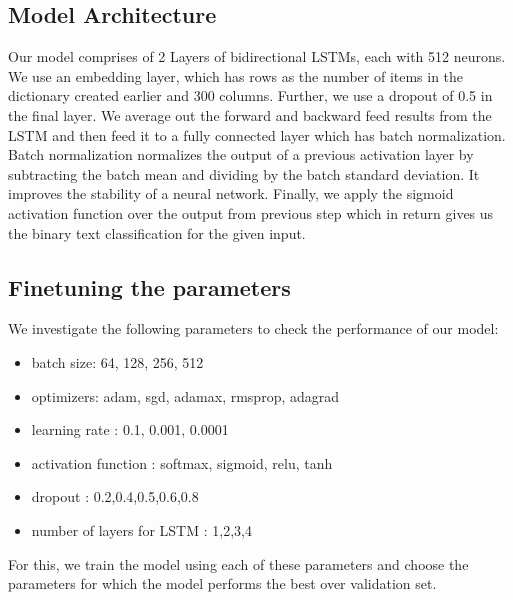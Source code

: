 \subsection{Model Architecture}
Our model comprises of 2 Layers of bidirectional LSTMs, each with 512 neurons. We use an embedding layer, which has rows as the number of items in the dictionary created earlier and 300 columns. Further, we use a dropout of 0.5 in the final layer. We average out the forward and backward feed results from the LSTM and then feed it to a fully connected layer which has batch normalization. Batch normalization normalizes the output of a previous activation layer by subtracting the batch mean and dividing by the batch standard deviation. It improves the stability of a neural network. Finally, we apply the sigmoid activation function over the output from previous step which in return gives us the binary text classification for the given input.\newline
\subsection{Finetuning the parameters}
We investigate the following parameters to check the performance of our model:
\begin{itemize}
    \item batch size: 64, 128, 256, 512
    \item optimizers: adam, sgd, adamax, rmsprop, adagrad \cite{DBLP:journals/corr/Ruder16}
    \item learning rate : 0.1, 0.001, 0.0001
    \item activation function : softmax, sigmoid, relu, tanh \cite{eger-etal-2018-time}
    \item dropout : 0.2,0.4,0.5,0.6,0.8 \cite{DBLP:journals/corr/abs-1207-0580}
    \item number of layers for LSTM : 1,2,3,4
\end{itemize}
For this, we train the model using each of these parameters and choose the parameters for which the model performs the best over validation set.